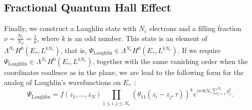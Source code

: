 \documentclass[a4paper,11pt]{article}
\begin{document}
\subsection{Fractional Quantum Hall Effect}
\label{section:fractionalquantumhalleffect}

Finally, we construct a Laughlin state with $N_{e}$ electrons and a filling fraction $\nu=\frac{N_{e}}{N_{\phi}}=\frac{1}{k}$, where $k$ is an odd number. This state is an element of $\Lambda^{N_{e}} H^{0}(E_{\tau}, L^{kN_{e}})$, that is, $\Psi_{\mathrm{Laughlin}} \in \Lambda^{N_{e}} H^{0}(E_{\tau}, L^{kN_{e}})$. If we require $\Psi_{\mathrm{Laughlin}} \in \Lambda^{N_{e}} H^{0}(E_{\tau}, L^{kN_{e}})$, together with the same vanishing order when the coordinates coallesce as in the plane, we are lead to the following form for the analog of Laughlin's wavefunctions on $E_{\tau}$~\cite{Haldane-Rezayi,LargeLimitKlevtsov}:
\begin{equation*}
    \Psi_{\mathrm{Laughlin}} = f(z_{1},\dots,z_{N})\prod_{1\leq i,j\leq N_{e}}(\theta_{11}(z_{i}-z_{j},\tau))^{k}e^{i\pi \tau k N_{e}\sum_{j=1}^{N_e}y^2_j}. 
\end{equation*}
\end{document}
